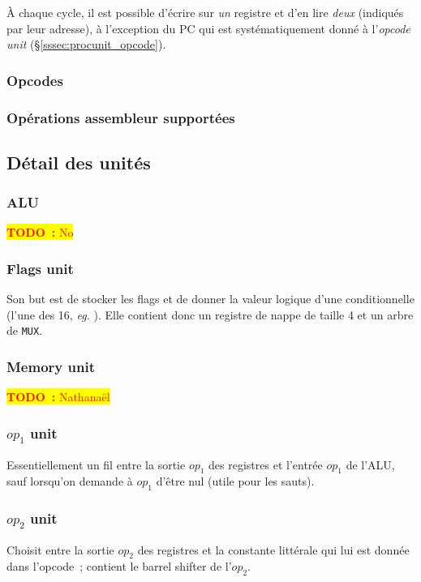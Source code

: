 \documentclass[11pt,a4paper]{article}
\newcommand{\todo}[1]{\colorbox{yellow}{\textcolor{red}{\textbf{TODO~:} #1}}}
\begin{document}
À chaque cycle, il est possible d'écrire sur \emph{un} registre et d'en lire \emph{deux} (indiqués par leur adresse), à l'exception du PC qui est systématiquement donné à l'\textit{opcode unit} (§\ref{sssec:procunit_opcode}).

\subsubsection{Opcodes} \label{sssec:opcodes}
\subsubsection{Opérations assembleur supportées}

\subsection{Détail des unités}

\subsubsection{ALU}
\todo{No}

\subsubsection{Flags unit}

Son but est de stocker les flags et de donner la valeur logique d'une conditionnelle (l'une des 16, \textit{eg.} ). Elle contient donc un registre de nappe de taille 4 et un arbre de \texttt{MUX}.

\subsubsection{Memory unit} \label{sssec:procunit_mem}
\todo{Nathanaël}

\subsubsection{$op_1$ unit}
Essentiellement un fil entre la sortie $op_1$ des registres et l'entrée $op_1$ de l'ALU, sauf lorsqu'on demande à $op_1$ d'être nul (utile pour les sauts).

\subsubsection{$op_2$ unit}
Choisit entre la sortie $op_2$ des registres et la constante littérale qui lui est donnée dans l'opcode~; contient le barrel shifter de l'$op_2$.
\end{document}
